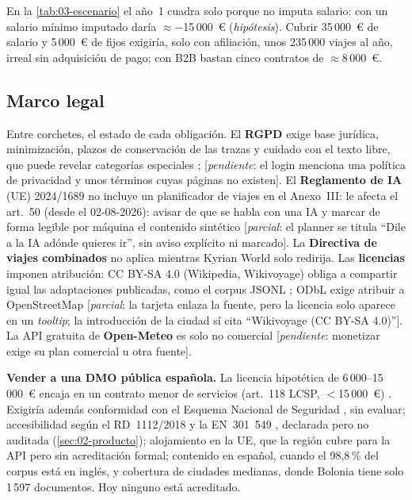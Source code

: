 En la \cref{tab:03-escenario} el año~1 cuadra solo porque no imputa salario: con un salario
mínimo imputado daría $\approx-$15\,000~€ (\emph{hipótesis}). Cubrir 35\,000~€ de salario y 5\,000~€ de fijos
exigiría, solo con afiliación, unos 235\,000 viajes al año, irreal sin adquisición de pago; con
B2B bastan cinco contratos de $\approx$8\,000~€.

\subsection{Marco legal}

Entre corchetes, el estado de cada obligación. El \textbf{RGPD} exige base jurídica,
minimización, plazos de conservación de las trazas y cuidado con el texto libre, que puede revelar
categorías especiales \cite{mk:anthropicpricing}; [\emph{pendiente}: el login menciona una política de privacidad y unos
términos cuyas páginas no existen]. El \textbf{Reglamento de IA} (UE) 2024/1689 no incluye un
planificador de viajes en el Anexo~III: le afecta el art.~50 (desde el 02-08-2026): avisar de que
se habla con una IA y marcar de forma legible por máquina el contenido sintético \cite{mk:aiact50} [\emph{parcial}: el planner se
titula ``Dile a la IA adónde quieres ir'', sin aviso explícito ni marcado]. La \textbf{Directiva de
viajes combinados} no aplica mientras Kyrian World solo redirija. Las \textbf{licencias} imponen
atribución: CC BY-SA 4.0 (Wikipedia, Wikivoyage) obliga a compartir igual las adaptaciones
publicadas, como el corpus JSONL \cite{ai:wikivoyagelicense}; ODbL exige atribuir a OpenStreetMap \cite{ai:osmcopyright}
[\emph{parcial}: la tarjeta enlaza la fuente, pero la licencia solo aparece en un \emph{tooltip};
la introducción de la ciudad sí cita ``Wikivoyage (CC BY-SA 4.0)'']. La API gratuita de
\textbf{Open-Meteo} es solo no comercial \cite{mk:openmeteo} [\emph{pendiente}: monetizar exige su
plan comercial u otra fuente].

\textbf{Vender a una DMO pública española.} La licencia hipotética de 6\,000--15\,000~€ encaja en
un contrato menor de servicios (art.~118 LCSP, $<$15\,000~€) \cite{fx:lcsp}. Exigiría además
conformidad con el Esquema Nacional de Seguridad \cite{fx:ens}, sin evaluar; accesibilidad según el
RD~1112/2018 y la EN~301~549 \cite{fx:rd1112,fx:en301549}, declarada pero no auditada
(\cref{sec:02-producto}); alojamiento en la UE, que la región  cubre para la API
pero sin acreditación formal; contenido en español, cuando el 98,8\,\% del corpus está en inglés, y
cobertura de ciudades medianas, donde Bolonia tiene solo 1\,597 documentos. Hoy ninguno está
acreditado.

